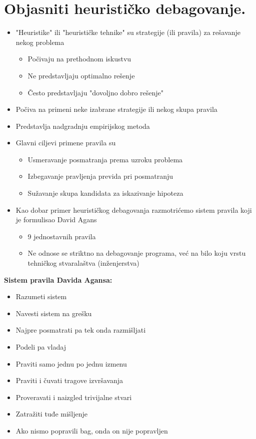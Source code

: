 \documentclass[a4paper]{article}
\begin{document}
\section{Objasniti heurističko debagovanje.}
  \begin{itemize}
    \item "Heuristike" ili "heurističke tehnike" su strategije (ili pravila) za rešavanje nekog problema
      \begin{itemize}
        \item Počivaju na prethodnom iskustvu
        \item Ne predstavljaju optimalno rešenje
        \item Često predstavljaju "dovoljno dobro rešenje"
      \end{itemize}
    \item Počiva na primeni neke izabrane strategije ili nekog skupa pravila
    \item Predstavlja nadgradnju empirijskog metoda
    \item Glavni ciljevi primene pravila su
      \begin{itemize}
        \item Usmeravanje posmatranja prema uzroku problema
        \item Izbegavanje pravljenja previda pri posmatranju
        \item Sužavanje skupa kandidata za iskazivanje hipoteza
      \end{itemize}
    \item Kao dobar primer heurističkog debagovanja razmotrićemo sistem pravila koji je formulisao David Agans
      \begin{itemize}
        \item 9 jednostavnih pravila
        \item Ne odnose se striktno na debagovanje programa, već na bilo koju vrstu tehničkog stvaralaštva (inženjerstva)\\
      \end{itemize}
    \end{itemize}

   \textbf{Sistem pravila Davida Agansa:}
    \begin{itemize}
	\begin{itemize}
      \item Razumeti sistem
      \item Navesti sistem na grešku
      \item Najpre posmatrati pa tek onda razmišljati
      \item Podeli pa vladaj
      \item Praviti samo jednu po jednu izmenu
      \item Praviti i čuvati tragove izvršavanja
      \item Proveravati i naizgled trivijalne stvari
      \item Zatražiti tuđe mišljenje
      \item Ako nismo popravili bag, onda on nije popravljen\\
	\end{itemize}
    \end{itemize}
\end{document}
